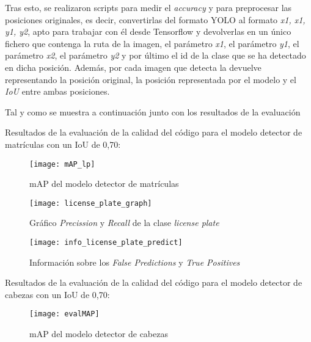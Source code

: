 
Tras esto, se realizaron scripts para medir el \textit{accuracy} y para preprocesar las posiciones originales, es decir, convertirlas del formato YOLO al formato \textit{x1, x1, y1, y2}, apto para trabajar con él desde Tensorflow y devolverlas en un único fichero que contenga la ruta de la imagen, el parámetro \textit{x1}, el parámetro \textit{y1}, el parámetro \textit{x2}, el parámetro \textit{y2} y por último el id de la clase que se ha detectado en dicha posición.
Además, por cada imagen que detecta la devuelve representando la posición original, la posición representada por el modelo y el \textit{IoU} entre ambas posiciones.

\clearpage

Tal y como se muestra a continuación junto con los resultados de la evaluación

\clearpage

Resultados de la evaluación de la calidad del código para el modelo detector de matrículas con un IoU de 0,70:
\begin{figure}[!h]
    \centering
    \texttt{[image: mAP\_lp]}
    \caption{mAP del modelo detector de matrículas}\label{fig:mAP_lp}
\end{figure}
\begin{figure}[!h]
    \centering
    \texttt{[image: license\_plate\_graph]}
    \caption{Gráfico \textit{Precission} y \textit{Recall} de la clase \textit{license plate}}\label{fig:license_plate_graph}

\end{figure}
\begin{figure}[!h]
    \centering
    \texttt{[image: info\_license\_plate\_predict]}
    \caption{Información sobre los \textit{False Predictions} y \textit{True Positives}}\label{fig:info_license_plate_predict}
\end{figure}

\clearpage

Resultados de la evaluación de la calidad del código para el modelo detector de cabezas con un IoU de 0,70:
\begin{figure}[!h]
    \centering
    \texttt{[image: evalMAP]}
    \caption{mAP del modelo detector de cabezas}\label{fig:evalMAP}
\end{figure}

